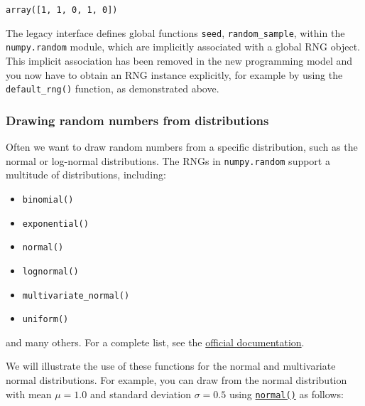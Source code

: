 \documentclass{scrartcl}
\makeatletter
\providecommand{\tightlist}{%
      \setlength{\itemsep}{0pt}\setlength{\parskip}{0pt}}
\newcommand{\boxspacing}{\kern\kvtcb@left@rule\kern\kvtcb@boxsep}
\newcommand{\prompt}[4]{
        {\ttfamily\llap{{\color{#2}[#3]:\hspace{3pt}#4}}\vspace{-\baselineskip}}
    }
\makeatother
\begin{document}
            \begin{tcolorbox}[breakable, size=fbox, boxrule=.5pt, pad at break*=1mm, opacityfill=0]
\prompt{Out}{outcolor}{11}{\boxspacing}
\begin{Verbatim}[commandchars=\\\{\}]
array([1, 1, 0, 1, 0])
\end{Verbatim}
\end{tcolorbox}
        
    The legacy interface defines global functions \texttt{seed},
\texttt{random\_sample}, \etc within the \texttt{numpy.random} module,
which are implicitly associated with a global RNG object. This implicit
association has been removed in the new programming model and you now
have to obtain an RNG instance explicitly, for example by using the
\texttt{default\_rng()} function, as demonstrated above.

    \hypertarget{drawing-random-numbers-from-distributions}{%
\subsubsection{Drawing random numbers from
distributions}\label{drawing-random-numbers-from-distributions}}

Often we want to draw random numbers from a specific distribution, such
as the normal or log-normal distributions. The RNGs in
\texttt{numpy.random} support a multitude of distributions, including:

\begin{itemize}
\tightlist
\item
  \texttt{binomial()}
\item
  \texttt{exponential()}
\item
  \texttt{normal()}
\item
  \texttt{lognormal()}
\item
  \texttt{multivariate\_normal()}
\item
  \texttt{uniform()}
\end{itemize}

and many others. For a complete list, see the
\href{https://numpy.org/doc/stable/reference/random/generator.html\#distributions}{official
documentation}.

We will illustrate the use of these functions for the normal and
multivariate normal distributions. For example, you can draw from the
normal distribution with mean \(\mu=1.0\) and standard deviation
\(\sigma=0.5\) using
\href{https://numpy.org/doc/stable/reference/random/generated/numpy.random.Generator.normal.html}{\texttt{normal()}}
as follows:
\end{document}
